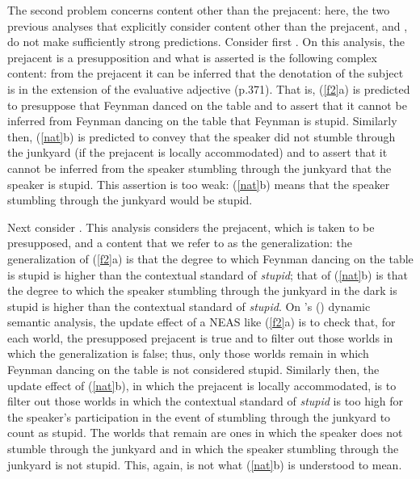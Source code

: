 \documentclass[11pt,fleqn]{article}
\newcommand{\6}{\mbox{$[\hspace*{-.6mm}[$}}
\newcommand{\9}{\mbox{$]\hspace*{-.6mm}]$}}
\newcommand{\citetpos}[1]{\citeauthor{#1}'s (\citeyear{#1})}
\begin{document}
The second problem concerns content other than the prejacent: here, the two previous analyses that explicitly consider content other than the prejacent, \citealt{oshima09b} and \citealt{barker02}, do not make sufficiently strong predictions. Consider first \citealt{oshima09b}. On this analysis, the prejacent is a presupposition and what is asserted is the following complex content: from the prejacent it can be inferred that the denotation of the subject is in the extension of the evaluative adjective (p.371). That is, (\ref{f2}a) is predicted to presuppose that Feynman danced on the table and to assert that it cannot be inferred from Feynman dancing on the table that Feynman is stupid. Similarly then, (\ref{nat}b) is predicted to convey that the speaker did not stumble through the junkyard (if the prejacent is locally accommodated) and to assert that it cannot be inferred from the speaker stumbling through the junkyard that the speaker is stupid. This assertion is too weak: (\ref{nat}b) means that the speaker stumbling through the junkyard would be stupid. 

Next consider \citealt{barker02}. This analysis considers the prejacent, which is taken to be presupposed, and a content that we refer to as the generalization: the generalization of (\ref{f2}a) is that the degree to which Feynman dancing on the table is stupid is higher than the contextual standard of {\em stupid}; that of (\ref{nat}b) is that the degree to which the speaker stumbling through the junkyard in the dark is stupid is higher than the contextual standard of {\em stupid}. On \citetpos{barker02} dynamic semantic analysis, the update effect of a NEAS like (\ref{f2}a) is to check that, for each world, the presupposed prejacent is true and to filter out those worlds in which the generalization is false; thus, only those worlds remain in which Feynman dancing on the table is not considered stupid. Similarly then, the update effect of (\ref{nat}b), in which the prejacent is locally accommodated, is to filter out those worlds in which the contextual standard of {\em stupid} is too high for the speaker's participation in the event of stumbling through the junkyard to count as stupid. The worlds that remain are ones in which the speaker does not stumble through the junkyard and in which the speaker stumbling through the junkyard is not stupid. This, again, is not what (\ref{nat}b) is understood to mean. 
\end{document}
